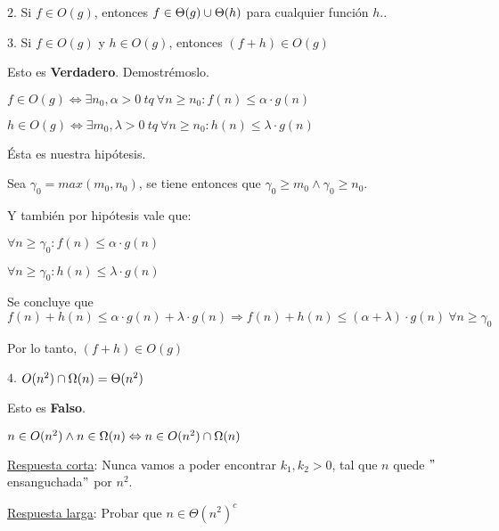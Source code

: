 \documentclass[10pt,a4paper]{article}
\begin{document}
\demoline
\demoline
\par $2.$ Si \ensuremath{f \in O(g)}, entonces \ensuremath{f \in \Theta(g) \union \Theta(h)} para cualquier función \ensuremath{h}..

\demoline
\demoline
\par $3.$ Si \ensuremath{f \in O(g)} y \ensuremath{h \in O(g)}, entonces \ensuremath{(f + h) \in O(g)}
\demoline
\begin{groupIzq}{2.5em}
  \par Esto es \textbf{Verdadero}. Demostrémoslo.
  \par \ensuremath{f \in O(g) \Leftrightarrow \exists n_0, \alpha > 0\ tq\ \forall n \geq n_0: f(n) \leq \alpha \cdot g(n)}
  \par \ensuremath{h \in O(g) \Leftrightarrow \exists m_0, \lambda > 0\ tq\ \forall n \geq n_0: h(n) \leq \lambda \cdot g(n)}
  \par Ésta es nuestra hipótesis.
  \par Sea \ensuremath{\gamma_0 = max(m_0, n_0)}, se tiene entonces que \ensuremath{\gamma_0 \geq m_0 \land \gamma_0 \geq n_0}.
  \par Y también por hipótesis vale que:
  \par \hspace{1em} \ensuremath{\forall n \geq \gamma_0: f(n) \leq \alpha \cdot g(n)}
  \par \hspace{1em} \ensuremath{\forall n \geq \gamma_0: h(n) \leq \lambda \cdot g(n)}
  \par Se concluye que \ensuremath{f(n) + h(n) \leq \alpha \cdot g(n) + \lambda \cdot g(n) \Rightarrow f(n) + h(n) \leq (\alpha + \lambda) \cdot g(n)\ \forall n \geq \gamma_0}
  \par Por lo tanto, \ensuremath{(f + h) \in O(g)}
\end{groupIzq}

\demoline
\demoline
\par $4.$ \ensuremath{O(n^2) \interseccion \Omega(n) = \Theta(n^2)}
\demoline
\begin{groupIzq}{2.5em}
  \par Esto es \textbf{Falso}.
  \par \ensuremath{n \in O(n^2) \land n \in \Omega(n) \Leftrightarrow n \in O(n^2) \interseccion \Omega(n)}
  \par \underline{Respuesta corta}: Nunca vamos a poder encontrar \ensuremath{k_1, k_2 > 0}, tal que \ensuremath{n} quede $"$ensanguchada$"$ por \ensuremath{n^2}.
  \par \underline{Respuesta larga}: Probar que \ensuremath{n \in \Theta(n^2)^c}
\end{groupIzq}
\end{document}
